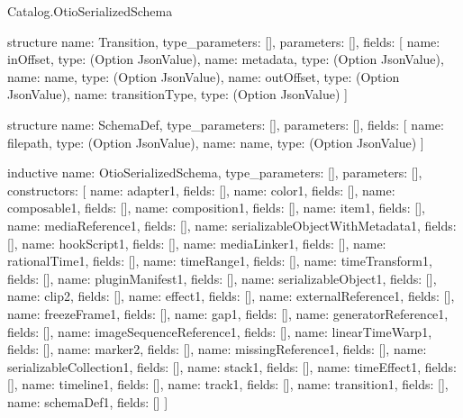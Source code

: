 \begin{lexlean}{Catalog.OtioSerializedSchema}
\begin{semanticmodule}
structure{
  name: Transition,
  type_parameters: [],
  parameters: [],
  fields: [
    {name: inOffset, type: (Option JsonValue)},
    {name: metadata, type: (Option JsonValue)},
    {name: name, type: (Option JsonValue)},
    {name: outOffset, type: (Option JsonValue)},
    {name: transitionType, type: (Option JsonValue)}
  ]
}

structure{
  name: SchemaDef,
  type_parameters: [],
  parameters: [],
  fields: [
    {name: filepath, type: (Option JsonValue)},
    {name: name, type: (Option JsonValue)}
  ]
}

inductive{
  name: OtioSerializedSchema,
  type_parameters: [],
  parameters: [],
  constructors: [
    {name: adapter1, fields: []},
    {name: color1, fields: []},
    {name: composable1, fields: []},
    {name: composition1, fields: []},
    {name: item1, fields: []},
    {name: mediaReference1, fields: []},
    {name: serializableObjectWithMetadata1, fields: []},
    {name: hookScript1, fields: []},
    {name: mediaLinker1, fields: []},
    {name: rationalTime1, fields: []},
    {name: timeRange1, fields: []},
    {name: timeTransform1, fields: []},
    {name: pluginManifest1, fields: []},
    {name: serializableObject1, fields: []},
    {name: clip2, fields: []},
    {name: effect1, fields: []},
    {name: externalReference1, fields: []},
    {name: freezeFrame1, fields: []},
    {name: gap1, fields: []},
    {name: generatorReference1, fields: []},
    {name: imageSequenceReference1, fields: []},
    {name: linearTimeWarp1, fields: []},
    {name: marker2, fields: []},
    {name: missingReference1, fields: []},
    {name: serializableCollection1, fields: []},
    {name: stack1, fields: []},
    {name: timeEffect1, fields: []},
    {name: timeline1, fields: []},
    {name: track1, fields: []},
    {name: transition1, fields: []},
    {name: schemaDef1, fields: []}
  ]
}
\end{semanticmodule}
\end{lexlean}
